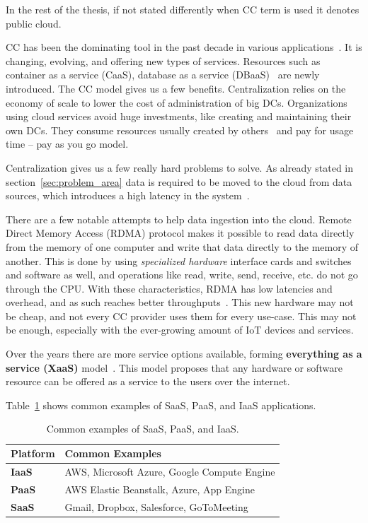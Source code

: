 \noindent
In the rest of the thesis, if not stated differently when CC term is used it denotes public cloud.

CC has been the dominating tool in the past decade in various applications~\cite{Satyanarayanan17}. It is changing, evolving, and offering new types of services. Resources such as container as a service (CaaS), database as a service (DBaaS)~\cite{Peter} are newly introduced. The CC model gives us a few benefits. Centralization relies on the economy of scale to lower the cost of administration of big DCs. Organizations using cloud services avoid huge investments, like creating and maintaining their own DCs. They consume resources usually created by others~\cite{Satyanarayanan17} and pay for usage time -- pay as you go model. 

Centralization gives us a few really hard problems to solve. As already stated in section~\ref{sec:problem_area} data is required to be moved to the cloud from data sources, which introduces a high latency in the system~\cite{HossainRH18}. 

There are a few notable attempts to help data ingestion into the cloud. Remote Direct Memory Access (RDMA) protocol makes it possible to read data directly from the memory of one computer and write that data directly to the memory of another. This is done by using \textit{specialized hardware} interface cards and switches and software as well, and operations like read, write, send, receive, etc. do not go through the CPU. With these characteristics, RDMA has low latencies and overhead, and as such reaches better throughputs~\cite{CohenTKCKRCDG09}. This new hardware may not be cheap, and not every CC provider uses them for every use-case. This may not be enough, especially with the ever-growing amount of IoT devices and services.

Over the years there are more service options available, forming \textbf{everything as a service (XaaS)} model~\cite{DuanFZSNH15}. This model proposes that any hardware or software resource can be offered as a service to the users over the internet.

Table~\ref{tab:table2} shows common examples of SaaS, PaaS, and IaaS applications.

\begin{table}[h!]
	\begin{center}
		\begin{tabular}{l|l}
			\textbf{Platform} & \textbf{Common Examples}\\
			\hline
			\textbf{IaaS} & AWS, Microsoft Azure, Google Compute Engine \\
			\textbf{PaaS} & AWS Elastic Beanstalk, Azure, App Engine \\
			\textbf{SaaS} & Gmail, Dropbox, Salesforce, GoToMeeting \\
		\end{tabular}
	\end{center}
	\vspace{-0.5cm}
	\caption{Common examples of SaaS, PaaS, and IaaS.}
	\label{tab:table2}
\end{table}

